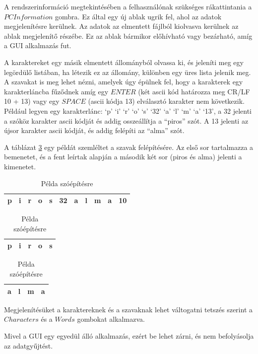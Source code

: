 \documentclass[12pt,a4paper,oneside]{report}
\begin{document}
A rendszerinformáció megtekintésében a felhasználónak szükséges rákattintania a $PC Information$ gombra. Ez által egy új ablak ugrik fel, ahol az adatok megjelenítésre kerülnek. Az adatok az elmentett fájlból kiolvasva kerülnek az ablak megjelenítő részébe. Ez az ablak bármikor előhívható vagy bezárható, amíg a GUI alkalmazás fut.

A karaktereket egy másik elmentett állományból olvassa ki, és jeleníti meg egy legördülő listában, ha létezik ez az állomány, különben egy üres lista jelenik meg. A szavakat is meg lehet nézni, amelyek úgy épülnek fel, hogy a karakterek egy karakterláncba fűződnek amíg egy $ENTER$ (két ascii kód határozza meg CR/LF 10 + 13) vagy egy $SPACE$ (ascii kódja 13) elválasztó karakter nem következik. Például legyen egy karakterlánc: `p' `i' `r' `o' `s' `32' `a' `l' `m' `a' `13', a 32 jelenti a szóköz karakter ascii kódját és addig osszeállítja a ``piros'' szót. A 13 jelenti az újsor karakter ascii kódját, és addig felépíti az ``alma'' szót.

A táblázat \ref{tab:karlanc} egy példát szemléltet a szavak felépítésére. Az első sor tartalmazza a bemenetet, és a fent leírtak alapján a második két sor (piros és alma) jelenti a kimenetet.
\begin{table}[H]
\caption{Példa szóépítésre}
\label{tab:karlanc}
\hspace{7em}
\begin{tabular}{|c|c|c|c|c|c|c|c|c|c|c|}
\hline
p&i&r&o&s&32&a&l&m&a&10\\
\hline
\end{tabular}
\vspace{5pt}

\hspace{7em}
\begin{tabular}{|c|c|c|c|c|}
\hline
p&i&r&o&s\\
\hline
\end{tabular}
\vspace{5pt}

\hspace{7em}
\begin{tabular}{|c|c|c|c|}
\hline
a&l&m&a\\
\hline
\end{tabular}
\end{table}
Megjelenítésüket a karaktereknek és a szavaknak lehet váltogatni tetszés szerint a $Characters$ és a $Words$ gombokat alkalmazva.

Mivel a GUI egy egyedül álló alkalmazás, ezért be lehet zárni, és nem befolyásolja az adatgyűjtést.
\end{document}
